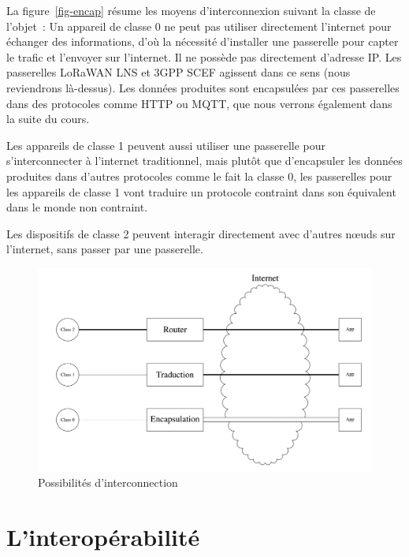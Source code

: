 La figure~\vref{fig-encap} résume les moyens d'interconnexion suivant la classe de l'objet~:
Un appareil de classe 0 ne peut pas utiliser directement l’internet pour échanger des informations, d’où la nécessité d’installer une passerelle pour capter le trafic et l’envoyer sur l’internet. Il ne possède pas directement d'adresse IP. Les passerelles LoRaWAN \ac{LNS} et \acs{3GPP} \ac{SCEF} agissent dans ce sens (nous reviendrons là-dessus). Les données produites sont encapsulées par ces passerelles dans des protocoles comme \ac{HTTP} ou \ac{MQTT}, que nous verrons également dans la suite du cours.

Les appareils de classe 1 peuvent aussi utiliser une passerelle pour s’interconnecter à l’internet traditionnel, mais plutôt que d'encapsuler les données produites dans d'autres protocoles comme le fait la classe 0, les passerelles pour les appareils de classe 1 vont traduire un protocole contraint dans son équivalent dans le monde non contraint.

Les dispositifs de classe 2 peuvent interagir directement avec d’autres nœuds sur l’internet, sans passer par une passerelle.

\begin{figure}[tbp]
\centerline{\includegraphics[width=1\columnwidth]{Pictures/Encpasul.png}}
\caption{Possibilités d'interconnection}
\label{fig-encap}
\end{figure}

  \vspace{2em}

\section{L'interopérabilité}

  \vspace{1em}


